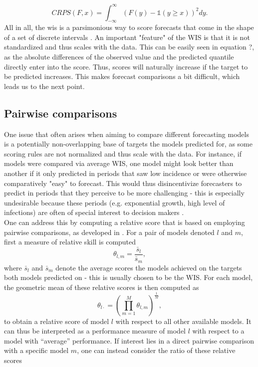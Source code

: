 \begin{equation}
CRPS(F, x) = \int_{-\infty}^{\infty} \left(F(y) - \mathbb{1}(y \geq x) \right)^2dy.
\end{equation}
All in all, the \ac{wis} is a parsimonious way to score forecasts that come in the shape of a set of discrete intervals \citep{sherratt_predictive_2022}.
An important "feature" of the WIS is that it is not standardized and thus scales with the data. This can be easily seen in equation ?, as the absolute differences of the observed value and the predicted quantile directly enter into the score. Thus, scores will naturally increase if the target to be predicted increases. This makes forecast comparisons a bit difficult, which leads us to the next point.
\subsection{Pairwise comparisons}
One issue that often arises when aiming to compare different forecasting models is a potentially non-overlapping base of targets the models predicted for, as some scoring rules are not normalized and thus scale with the data. For instance, if models were compared via average WIS, one model might look better than another if it only predicted in periods that saw low incidence or were otherwise comparatively "easy" to forecast. This would thus disincentivize forecasters to predict in periods that they perceive to be more challenging - this is especially undesirable because these periods (e.g. exponential growth, high level of infections) are often of special interest to decision makers .\\
One can address this by computing a relative score that is based on employing pairwise comparisons, as developed in \cite{cramer_evaluation_2022}. For a pair of models denoted $l$ and $m$, first a measure of relative skill is computed
\[
\theta_{l,m} = \frac{\bar{s}_{l}}{\bar{s}_{m}},
\]
where $\bar{s}_{l}$ and $\bar{s}_{m}$ denote the average scores the models achieved on the targets both models predicted on - this is usually chosen to be the WIS. For each model, the geometric mean of these relative scores is then computed as
\[
\theta_{l\cdot} = \left(\prod_{m = 1}^{M}\theta_{l,m} \right)^{\frac{1}{M}},
\]to obtain a relative score of model $l$ with respect to all other available models. It can thus be interpreted as a performance measure of model $l$ with respect to a model with ``average'' performance. If interest lies in a direct pairwise comparison with a specific model $m$, one can instead consider the ratio of these relative scores
